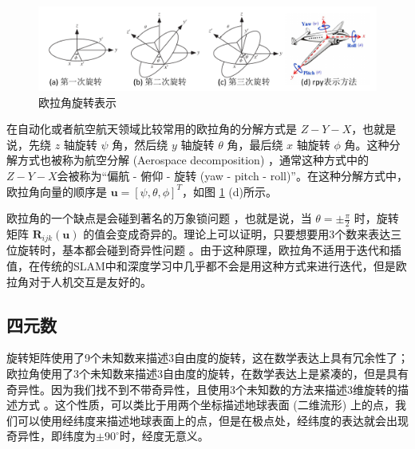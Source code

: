\begin{figure}
    \centering
    \includegraphics[width=\textwidth]{images/rotation.pdf}
    \caption{欧拉角旋转表示}
    \label{fig:rotation}
    \vspace{-0.5cm}
\end{figure}

在自动化或者航空航天领域比较常用的欧拉角的分解方式是 $Z-Y-X$，也就是说，先绕 $z$ 轴旋转 $\psi$ 角，然后绕 $y$ 轴旋转 $\theta$ 角，最后绕 $x$ 轴旋转 $\phi$ 角。这种分解方式也被称为航空分解 (Aerospace decomposition) ，通常这种方式中的$Z-Y-X$会被称为“偏航 - 俯仰 - 旋转 (yaw - pitch - roll)”。在这种分解方式中，欧拉角向量的顺序是 $\boldsymbol{u} = [\psi, \theta, \phi]^T$，如图 \ref{fig:rotation} (d)所示。

欧拉角的一个缺点是会碰到著名的万象锁问题\cite{vsenk2006rotation} ，也就是说，当 $\theta = \pm \frac{\pi}{2}$ 时，旋转矩阵 $\boldsymbol{R}_{ijk}(\boldsymbol{u})$ 的值会变成奇异的。理论上可以证明，只要想要用3个数来表达三位旋转时，基本都会碰到奇异性问题\cite{stuelpnagel1964parametrization} 。由于这种原理，欧拉角不适用于迭代和插值，在传统的SLAM中和深度学习中几乎都不会是用这种方式来进行迭代，但是欧拉角对于人机交互是友好的。

\subsection{四元数}
旋转矩阵使用了9个未知数来描述3自由度的旋转，这在数学表达上具有冗余性了；欧拉角使用了3个未知数来描述3自由度的旋转，在数学表达上是紧凑的，但是具有奇异性。因为我们找不到不带奇异性，且使用3个未知数的方法来描述3维旋转的描述方式\cite{stuelpnagel1964parametrization} 。这个性质，可以类比于用两个坐标描述地球表面 (二维流形) 上的点，我们可以使用经纬度来描述地球表面上的点，但是在极点处，经纬度的表达就会出现奇异性，即纬度为$\pm 90^{\circ}$时，经度无意义。

